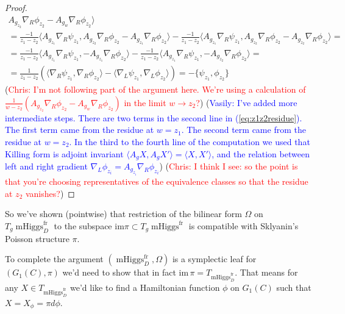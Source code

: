 \documentclass[11pt, oneside, reqno]{amsart}
\theoremstyle{definition} \newtheorem{definition}{Definition}[section]
\theoremstyle{definition} \newtheorem{remark}[definition]{Remark}
\theoremstyle{definition} \newtheorem{remarks}[definition]{Remarks}
\theoremstyle{definition} \newtheorem{question}[definition]{Question}
\theoremstyle{definition} \newtheorem*{note}{Note}
\theoremstyle{definition} \newtheorem{example}[definition]{Example}
\theoremstyle{definition} \newtheorem{examples}[definition]{Examples}
\DeclareMathOperator{\mhiggs}{mHiggs}
\newcommand{\fr}{\mathrm{fr}}
\newcommand{\chris}[1]{(\textcolor{red}{Chris: #1})}
\newcommand{\vasily}[1]{(\textcolor{blue}{Vasily: #1})}
\begin{document}
\begin{proof}
\begin{multline}
   A_{g_{z_2}} \nabla_{R} \phi_{z_2}  - A_{g_w} \nabla_{R} \phi_{z_2} \rangle \\
   =   \frac{-1}{z_1 - z_2}  \langle A_{g_{z_1}} \nabla_{R} \psi_{z_1} , A_{g_{z_2}} \nabla_{R} \phi_{z_2}  - A_{g_{z_1}} \nabla_{R} \phi_{z_2} \rangle   - \frac{-1}{z_1 - z_2}  \langle A_{g_{z_1}} \nabla_{R} \psi_{z_1} , A_{g_{z_2}} \nabla_{R} \phi_{z_2}  - A_{g_{z_2}} \nabla_{R} \phi_{z_2}   \rangle =\\
      =   \frac{-1}{z_1 - z_2}  \langle A_{g_{z_1}} \nabla_{R} \psi_{z_1} ,  - A_{g_{z_1}} \nabla_{R} \phi_{z_2} \rangle   - \frac{-1}{z_1 - z_2}  \langle A_{g_{z_1}} \nabla_{R} \psi_{z_1} ,  - A_{g_{z_2}} \nabla_{R} \phi_{z_2}   \rangle =\\
   = \frac{1}{z_1 - z_2} (\langle \nabla_{R} \psi_{z_1} , \nabla_{R} \phi_{z_2}\rangle - 
   \langle  \nabla_{L} \psi_{z_1} , \nabla_{L} \phi_{z_2} \rangle ) =
   - \{\psi_{z_1}, \phi_{z_2} \} 
  \end{multline}
  \chris{I'm not following part of the argument here.  We're using a calculation of $\frac 1{w-z_2}(A_{g_{z_2}} \nabla_{R} \phi_{z_2}  - A_{g_w} \nabla_{R} \phi_{z_2})$ in the limit $w\to z_2$?}
  \vasily{I've added more intermediate steps. There are two terms in the second line in (\ref{eq:z1z2residue}).
    The first term came from  the residue at $w=z_1$.
    The second term came from the residue at $w=z_2$. 
In the third to the fourth line of the computation we used that Killing form is adjoint invariant
$\langle A_{g} X, A_{g} X' \rangle = \langle X, X' \rangle $,
and the relation between left and right gradient $\nabla_{L} \phi_{z_i} = A_{g_{z_i}} \nabla_{R} \phi_{z_i}$} \chris{I think I see: so the point is that you're choosing representatives of the equivalence classes so that the residue at $z_2$ vanishes?}
\end{proof}

So we've shown (pointwise) that restriction of the bilinear form $\Omega$ on $T_g\mhiggs^{\fr}_{D}$
  to the subspace $\mathrm{im} \pi \subset T_g\mhiggs^{\fr}$ is compatible with
Sklyanin's Poisson structure $\pi$.

To complete the argument  $(\mhiggs^{\fr}_{D}, \Omega)$ is
a symplectic leaf for $(G_1(C), \pi)$ we'd need to show that in fact
$\mathrm{im} \, \pi = T_{\mhiggs^{\fr}_{D}}$.
That means for any $X \in T_{\mhiggs^{\fr}_{D}} $ we'd like to find a Hamiltonian
function $\phi$ on $G_1(C)$ such that $X = X_{\phi} = \pi d \phi$.
\end{document}
